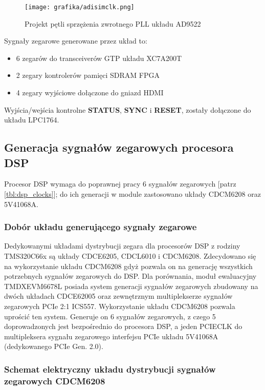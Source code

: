  \begin{figure}[here]
\begin{center}
\texttt{[image: grafika/adisimclk.png]}
\caption{Projekt pętli sprzężenia zwrotnego PLL układu AD9522}
\end{center}
\end{figure}
  
 
 Sygnały zegarowe generowane przez układ to:
 \begin{itemize}
\item
6 zegarów do transceiverów GTP układu XC7A200T
\item
2 zegary kontrolerów pamięci SDRAM FPGA
\item
4 zegary wyjściowe dołączone do gniazd HDMI
\end{itemize}
 
  Wyjścia/wejścia kontrolne \textbf{STATUS}, \textbf{SYNC} i \textbf{RESET}, zostały dołączone do układu LPC1764.

\subsection{Generacja sygnałów zegarowych procesora DSP}
Procesor DSP wymaga do poprawnej pracy 6 sygnałów zegarowych [patrz \ref{tbl:dsp_clocks}]; do ich generacji w module zastosowano układy CDCM6208 oraz 5V41068A. 


\subsubsection{Dobór układu generującego sygnały zegarowe}

Dedykowanymi układami dystrybucji zegara dla procesorów DSP z rodziny TMS320C66x są układy CDCE6205, CDCL6010 i CDCM6208. Zdecydowano się na wykorzystanie układu CDCM6208 gdyż pozwala on na generację wszystkich potrzebnych sygnałów zegarowych do DSP.  Dla porównania, moduł ewaluacyjny TMDXEVM6678L \cite{TMDXEVM6678L} posiada system generacji sygnałów zegarowych zbudowany na dwóch układach CDCE62005 oraz zewnętrznym multiplekserze sygnałów zegarowych PCIe 2:1 ICS557. Wykorzystanie układu CDCM6208 pozwala uprościć ten system. Generuje on 6 sygnałów zegarowych, z czego 5 doprowadzonych jest bezpośrednio do procesora DSP, a jeden PCIECLK do multipleksera sygnału zegarowego interfejsu PCIe układu 5V41068A (dedykowanego PCIe Gen. 2.0). 

\subsubsection{Schemat elektryczny układu dystrybucji sygnałów zegarowych CDCM6208}

